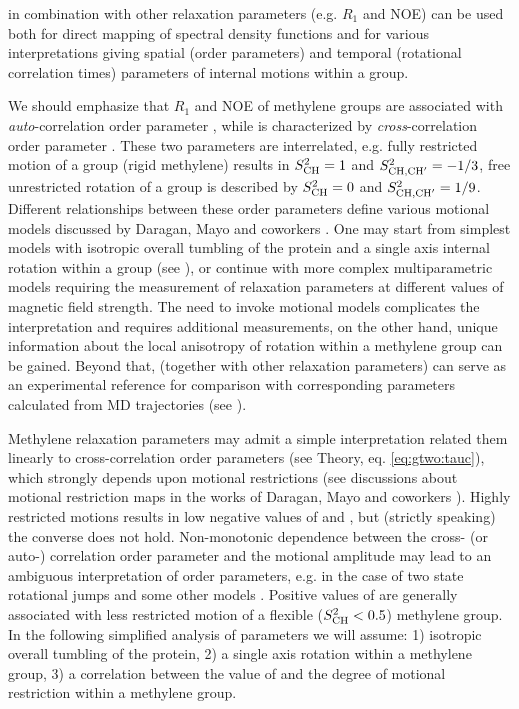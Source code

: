 \documentclass[twocolumn]{svjour3}           %
\begin{document}
\gtwoCH{} in combination with other relaxation parameters (e.g. $R_1$ 
and NOE) can be used both for direct mapping of spectral density functions
\cite{kaderavek_spectral_2016}  and for various interpretations 
giving spatial (order parameters) and temporal (rotational correlation 
times) parameters of internal motions within a \CHtwo{} group.

We should emphasize that $R_1$ and NOE of methylene groups are associated with \emph{auto}{-}cor\-re\-la\-tion order parameter \StwoCH{}, while  \gtwoCH{} is characterized by \emph{cross}-correlation order parameter \StwoCHp{}.
These two parameters are interrelated, e.g. fully restricted motion of a \CHtwo{} group (rigid methylene) results in $S^2_\text{CH}=1$ and $S^2_{\text{CH,CH}'}=-1/3$, free unrestricted rotation of a \CHtwo{} group is described by $S^2_\text{CH}=0$ and $S^2_{\text{CH,CH}'}=1/9$. 
Different relationships between these order parameters define various motional models discussed by Daragan, Mayo and coworkers  \cite{idiyatullin_simple_2004,daragan_motional_1997,daragan_using_1995}.
One may 
start from simplest models with isotropic overall tumbling of the 
protein and a single axis internal rotation within a \CHtwo{} group (see 
\cite{daragan_motional_1997,zheng_measurement_2004,daragan_using_1995}), 
or continue with more complex multiparametric models
\cite{paquin_multiple-timescale_2008,ferrage_chapter_2017,ghalebani_nmr_2008,kaderavek_spectral_2016} 
requiring the measurement of relaxation parameters at different values 
of magnetic field strength. The need to invoke motional models complicates the interpretation and requires additional measurements, on the other hand, unique information about the local anisotropy of rotation within a methylene group can be gained. Beyond that, \gtwoCH{} (together with other
relaxation parameters) can serve as an experimental reference for
comparison with corresponding parameters calculated from MD
trajectories (see \cite{aliev_motional_2014}).

Methylene relaxation parameters \gtwoCH{} may admit a simple
interpretation related them linearly to cross-correlation order parameters
(see Theory, eq. \eqref{eq:gtwo:tauc}), which strongly depends upon motional restrictions (see discussions about motional restriction maps in the works of Daragan, Mayo and coworkers  \cite{idiyatullin_simple_2004,daragan_motional_1997,daragan_using_1995}). 
Highly restricted motions results in low negative values of \gtwoCH{} and \StwoCHp{}, but (strictly speaking) the converse does not hold. Non-monotonic dependence between the cross- (or auto-) correlation order parameter and the motional amplitude may lead to an ambiguous interpretation of order parameters, e.g. in the case of two state rotational jumps and some other models \cite{daragan_using_1995,idiyatullin_simple_2004}. Positive values of \gtwoCH{} are generally associated with less restricted motion of a flexible ($S^2_\text{CH}<0.5$) methylene group. In the following simplified analysis of \gtwoCH{} parameters we will assume: 1) isotropic overall tumbling of the protein, 2) a single axis rotation within a methylene group, 3) a correlation between the value of \gtwoCH{} and the degree of motional restriction within a methylene group.
\end{document}
